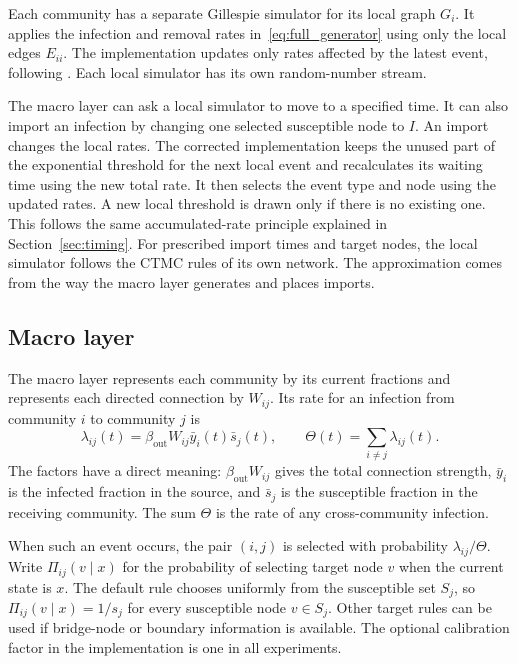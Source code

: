 \documentclass[a4paper,fleqn]{cas-sc}
\newcommand{\ibar}{\bar{y}}
\newcommand{\sbar}{\bar{s}}
\begin{document}
Each community has a separate Gillespie simulator for its local graph $G_i$. It applies the infection and removal rates in~\eqref{eq:full_generator} using only the local edges $E_{ii}$. The implementation updates only rates affected by the latest event, following \citet{kuryliak2025simulating}. Each local simulator has its own random-number stream.

The macro layer can ask a local simulator to move to a specified time. It can also import an infection by changing one selected susceptible node to $I$. An import changes the local rates. The corrected implementation keeps the unused part of the exponential threshold for the next local event and recalculates its waiting time using the new total rate. It then selects the event type and node using the updated rates. A new local threshold is drawn only if there is no existing one. This follows the same accumulated-rate principle explained in Section~\ref{sec:timing}. For prescribed import times and target nodes, the local simulator follows the CTMC rules of its own network. The approximation comes from the way the macro layer generates and places imports.

\subsection{Macro layer}
\label{sec:macro}

The macro layer represents each community by its current fractions and represents each directed connection by $W_{ij}$. Its rate for an infection from community $i$ to community $j$ is
\begin{equation}
\label{eq:macro_rate}
\lambda_{ij}(t)=\beta_{\mathrm{out}}W_{ij}\ibar_i(t)\sbar_j(t),
\qquad
\Theta(t)=\sum_{i\neq j}\lambda_{ij}(t).
\end{equation}
The factors have a direct meaning: $\beta_{\mathrm{out}}W_{ij}$ gives the total connection strength, $\ibar_i$ is the infected fraction in the source, and $\sbar_j$ is the susceptible fraction in the receiving community. The sum $\Theta$ is the rate of any cross-community infection.

When such an event occurs, the pair $(i,j)$ is selected with probability $\lambda_{ij}/\Theta$. Write $\Pi_{ij}(v\mid x)$ for the probability of selecting target node $v$ when the current state is $x$. The default rule chooses uniformly from the susceptible set $S_j$, so $\Pi_{ij}(v\mid x)=1/s_j$ for every susceptible node $v\in S_j$. Other target rules can be used if bridge-node or boundary information is available. The optional calibration factor in the implementation is one in all experiments.
\end{document}
